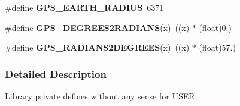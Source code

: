\begin{DoxyCompactItemize}
\item 
\hypertarget{group___t_m___g_p_s___macros_ga550b34dc59c859ae3b25198167cd30c5}{}\#define {\bfseries G\+P\+S\+\_\+\+E\+A\+R\+T\+H\+\_\+\+R\+A\+D\+I\+U\+S}~6371\label{group___t_m___g_p_s___macros_ga550b34dc59c859ae3b25198167cd30c5}

\item 
\hypertarget{group___t_m___g_p_s___macros_gac3b4faf735022b37bca58234578e883d}{}\#define {\bfseries G\+P\+S\+\_\+\+D\+E\+G\+R\+E\+E\+S2\+R\+A\+D\+I\+A\+N\+S}(x)~((x) $\ast$ (float)0.)\label{group___t_m___g_p_s___macros_gac3b4faf735022b37bca58234578e883d}

\item 
\hypertarget{group___t_m___g_p_s___macros_ga5aa88fbb1990eb8ff302ddfe7a33e9bd}{}\#define {\bfseries G\+P\+S\+\_\+\+R\+A\+D\+I\+A\+N\+S2\+D\+E\+G\+R\+E\+E\+S}(x)~((x) $\ast$ (float)57.)\label{group___t_m___g_p_s___macros_ga5aa88fbb1990eb8ff302ddfe7a33e9bd}

\end{DoxyCompactItemize}


\subsubsection{Detailed Description}
Library private defines without any sense for U\+S\+E\+R. 

